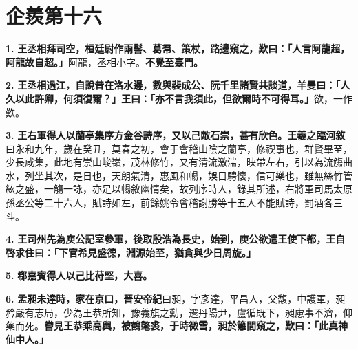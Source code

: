 \chapter{企羨第十六}

\textbf{1.} \textbf{王丞相拜司空，桓廷尉作兩髻、葛帬、策杖，路邊窺之，歎曰：「人言阿龍超，阿龍故自超。」}{\footnotesize 阿龍，丞相小字。}\textbf{不覺至臺門。}

\textbf{2.} \textbf{王丞相過江，自說昔在洛水邊，數與裴成公、阮千里諸賢共談道，羊曼曰：「人久以此許卿，何須復爾？」王曰：「亦不言我須此，但欲爾時不可得耳。」}{\footnotesize 欲，一作歎。}

\textbf{3.} \textbf{王右軍得人以蘭亭集序方金谷詩序，又以己敵石崇，甚有欣色。}{\footnotesize \textbf{王羲之臨河敘}曰永和九年，歲在癸丑，莫春之初，會于會稽山陰之蘭亭，修禊事也，群賢畢至，少長咸集，此地有崇山峻嶺，茂林修竹，又有清流激湍，映帶左右，引以為流觴曲水，列坐其次，是日也，天朗氣清，惠風和暢，娛目騁懷，信可樂也，雖無絲竹管絃之盛，一觴一詠，亦足以暢敘幽情矣，故列序時人，錄其所述，右將軍司馬太原孫丞公等二十六人，賦詩如左，前餘姚令會稽謝勝等十五人不能賦詩，罰酒各三斗。}

\textbf{4.} \textbf{王司州先為庾公記室參軍，後取殷浩為長史，始到，庾公欲遣王使下都，王自啓求住曰：「下官希見盛德，淵源始至，猶貪與少日周旋。」}

\textbf{5.} \textbf{郗嘉賓得人以己比苻堅，大喜。}

\textbf{6.} \textbf{孟昶未達時，家在京口，}{\footnotesize \textbf{晉安帝紀}曰昶，字彥達，平昌人，父馥，中護軍，昶矜嚴有志局，少為王恭所知，豫義旗之勳，遷丹陽尹，盧循既下，昶慮事不濟，仰藥而死。}\textbf{嘗見王恭乘高輿，被鶴氅裘，于時微雪，昶於籬間窺之，歎曰：「此真神仙中人。」}